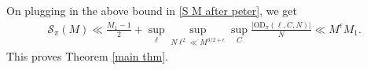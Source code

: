 \documentclass[12pt,a4paper,twoside, reqno]{amsart}
\begin{document}
On plugging in the above bound in \eqref{S M after peter}, we get 
\begin{align}
    \mathcal{S}_\pi(M) 
     \ll \frac{M_1-1}{2}+\sup_\ell \sup_{N\ell^2 \ll M^{3/2+\epsilon}} \sup_{ C}\frac{|\mathrm{OD}_{\pi}(\ell,C, N)| }{N} \ll M^\epsilon M_1. 
\end{align}
This proves   Theorem \ref{main thm}.
\end{document}

